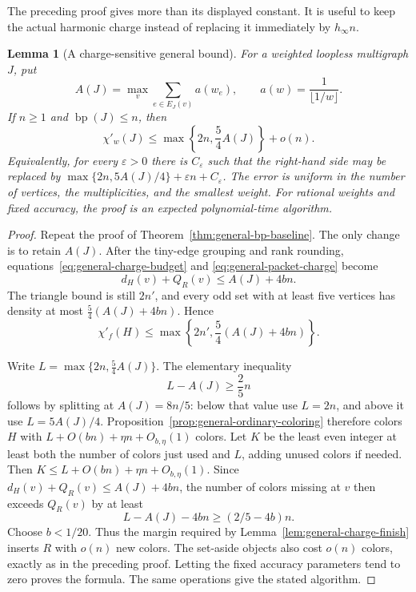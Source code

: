 \documentclass[11pt]{article}
\newtheorem{lemma}[theorem]{Lemma}
\theoremstyle{definition}\newtheorem{algorithm}{Algorithm}[section]
\numberwithin{equation}{section}
\theoremstyle{remark}\newtheorem*{remark}{Remark}
\newcommand{\bp}{\operatorname{bp}}
\begin{document}
The preceding proof gives more than its displayed constant.  It is useful
to keep the actual harmonic charge instead of replacing it immediately by
$h_\infty n$.

\begin{lemma}[A charge-sensitive general bound]
\label{lem:general-charge-sensitive}
For a weighted loopless multigraph $J$, put
\[
 A(J)=\max_v\sum_{e\in E_J(v)}a(w_e),
 \qquad a(w)=\frac1{\lfloor1/w\rfloor}.
\]
If $n\ge1$ and $\bp(J)\le n$, then
\[
 \chi'_w(J)\le
 \max\left\{2n,\frac54A(J)\right\}+o(n).
\]
Equivalently, for every $\varepsilon>0$ there is $C_\varepsilon$ such
that the right-hand side may be replaced by
$\max\{2n,5A(J)/4\}+\varepsilon n+C_\varepsilon$.
The error is uniform in the number of vertices, the multiplicities, and
the smallest weight.  For rational weights and fixed accuracy, the proof
is an expected polynomial-time algorithm.
\end{lemma}
\begin{proof}
Repeat the proof of Theorem~\ref{thm:general-bp-baseline}.  The only
change is to retain $A(J)$.  After the tiny-edge grouping and rank
rounding, equations~\eqref{eq:general-charge-budget} and
\eqref{eq:general-packet-charge} become
\[
 d_H(v)+Q_R(v)\le A(J)+4bn.
\]
The triangle bound is still $2n'$, and every odd set with at least five
vertices has density at most $\frac54(A(J)+4bn)$.  Hence
\[
 \chi'_f(H)\le
 \max\left\{2n',\frac54(A(J)+4bn)\right\}.
\]

Write $L=\max\{2n,\frac54A(J)\}$.  The elementary inequality
\begin{equation}\label{eq:charge-margin}
 L-A(J)\ge\frac25n
\end{equation}
follows by splitting at $A(J)=8n/5$: below that value use $L=2n$,
and above it use $L=5A(J)/4$.  Proposition~\ref{prop:general-ordinary-coloring}
therefore colors $H$ with $L+O(bn)+\eta n+O_{b,\eta}(1)$ colors.
Let $K$ be the least even integer at least both the number of colors just
used and $L$, adding unused colors if needed.  Then
$K\le L+O(bn)+\eta n+O_{b,\eta}(1)$.  Since
$d_H(v)+Q_R(v)\le A(J)+4bn$, the number of colors missing at $v$ then
exceeds $Q_R(v)$ by at least
\[
 L-A(J)-4bn\ge(2/5-4b)n.
\]
Choose $b<1/20$.  Thus the margin required by
Lemma~\ref{lem:general-charge-finish} inserts $R$ with $o(n)$ new
colors.  The set-aside objects also cost $o(n)$ colors, exactly as in
the preceding proof.  Letting the fixed accuracy parameters tend to
zero proves the formula.  The same operations give the stated algorithm.
\end{proof}
\end{document}
